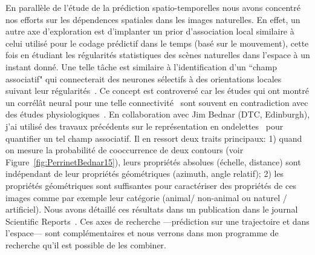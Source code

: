 \documentclass[11pt,french,a4paper,oneside]{article}%
\begin{document}
En parallèle de l'étude de la prédiction spatio-temporelles nous avons concentré nos efforts sur les dépendences spatiales dans les images naturelles.
En effet, un autre axe d'exploration est d'implanter un prior d'association local similaire à celui utilisé pour le codage prédictif dans le temps (basé sur le mouvement), cette fois en étudiant les régularités statistiques des scènes naturelles dans l'espace à un instant donné. Une telle tâche est similaire à l'identification d'un ``champ associatif" qui connecterait des neurones sélectifs à des orientations locales suivant leur régularités~\citep{Field93}. Ce concept est controversé car les études qui ont montré un corrélât neural pour une telle connectivité~\citep{Bosking97} sont souvent en contradiction avec des études physiologiques~\citep{Chavane11,Hunt12}. En collaboration avec Jim Bednar (DTC, Edinburgh), j'ai utilisé des travaux précédents sur le représentation en ondelettes~\citep{Fischer07cv} pour quantifier un tel champ associatif. Il en ressort deux traits principaux: 1) quand on mesure la probabilité de cooccurrence de deux contours (voir Figure~\ref{fig:PerrinetBednar15}), leurs propriétés absolues (échelle, distance) sont indépendant de leur propriétés géométriques (azimuth, angle relatif); 2) les propriétés géométriques sont suffisantes pour caractériser des propriétés de ces images comme par exemple leur catégorie (animal/ non-animal ou naturel / artificiel). Nous avons détaillé ces résultats dans un publication dans le journal Scientific Reports~\citep{PerrinetBednar15}. Ces axes de recherche ---prédiction sur une trajectoire et dans l'espace--- sont complémentaires et nous verrons dans mon programme de recherche qu'il est possible de les combiner.
\end{document}
